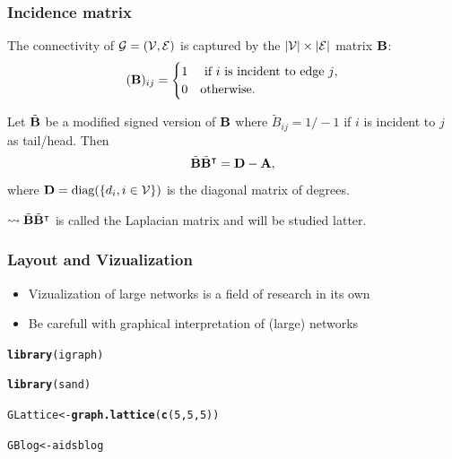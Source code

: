 \documentclass{beamer}\usepackage[]{graphicx}\usepackage[]{color}
\makeatletter
\newcommand{\hlnum}[1]{\textcolor[rgb]{0.686,0.059,0.569}{#1}}%
\newcommand{\hlstd}[1]{\textcolor[rgb]{0.345,0.345,0.345}{#1}}%
\newcommand{\hlkwb}[1]{\textcolor[rgb]{0.69,0.353,0.396}{#1}}%
\newcommand{\hlkwd}[1]{\textcolor[rgb]{0.737,0.353,0.396}{\textbf{#1}}}%
\newenvironment{kframe}{%
 \def\at@end@of@kframe{}%
 \ifinner\ifhmode%
  \def\at@end@of@kframe{\end{minipage}}%
  \begin{minipage}{\columnwidth}%
 \fi\fi%
 \def\FrameCommand##1{\hskip\@totalleftmargin \hskip-\fboxsep
 \colorbox{shadecolor}{##1}\hskip-\fboxsep
     \hskip-\linewidth \hskip-\@totalleftmargin \hskip\columnwidth}%
 \MakeFramed {\advance\hsize-\width
   \@totalleftmargin\z@ \linewidth\hsize
   \@setminipage}}%
 {\par\unskip\endMakeFramed%
 \at@end@of@kframe}
\newenvironment{knitrout}{}{} %
\makeatother
\begin{document}
\begin{frame}
  \frametitle{Incidence matrix}

  \begin{definition}
    The connectivity of $\mathcal{G} = (\mathcal{V},\mathcal{E})$ is captured by the $|\mathcal{V}|\times |\mathcal{E}|$ matrix $\mathbf{B}$:
    \[
      (\mathbf{B})_{ij} = \begin{cases}
      1  & \text{ if $i$ is incident to edge $j$},\\
      0  & \text{otherwise}.
      \end{cases}
    \]
  \end{definition}

  \begin{proposition}[Relationship]
    Let $\tilde{\mathbf{B}}$ be a modified \alert{signed} version of $\mathbf{B}$ where $\tilde{\! B}_{ij}= 1/-1$ if $i$ is incident to $j$ as tail/head. Then
    \[
      \tilde {\mathbf{B}} \tilde {\mathbf{B}}^\intercal = \mathbf{D} - \mathbf{A},
    \]
    where $\mathbf{D} = \text{diag}(\left\{d_i, i\in\mathcal{V}\right\})$ is the diagonal matrix of degrees. 
  \end{proposition}

  $\rightsquigarrow \tilde {\mathbf{B}} \tilde {\mathbf{B}}^\intercal $ is called the Laplacian matrix and will be studied latter.

\end{frame}


\begin{frame}
  \frametitle{Layout and Vizualization}
  
  \begin{itemize}
    \item Vizualization of large networks is a field of research in its own
    \item Be carefull with graphical interpretation of (large) networks
  \end{itemize}

\begin{knitrout}\scriptsize
{}\color{fgcolor}\begin{kframe}
\begin{alltt}
\hlkwd{library}\hlstd{(igraph)}

\hlkwd{library}\hlstd{(sand)}

\hlstd{GLattice} \hlkwb{<-} \hlkwd{graph.lattice}\hlstd{(}\hlkwd{c}\hlstd{(}\hlnum{5}\hlstd{,}\hlnum{5}\hlstd{,}\hlnum{5}\hlstd{))}

\hlstd{GBlog}    \hlkwb{<-} \hlstd{aidsblog}
\end{alltt}
\end{kframe}
\end{knitrout}
  
\end{frame}
\end{document}

